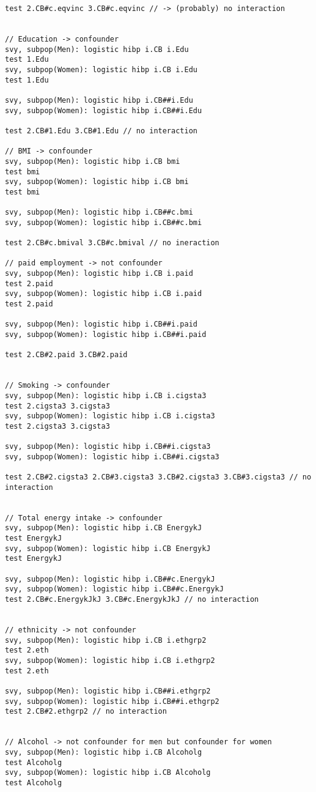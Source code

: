 \documentclass[]{article}
\begin{document}
\begin{verbatim}
test 2.CB#c.eqvinc 3.CB#c.eqvinc // -> (probably) no interaction


// Education -> confounder
svy, subpop(Men): logistic hibp i.CB i.Edu 
test 1.Edu
svy, subpop(Women): logistic hibp i.CB i.Edu 
test 1.Edu

svy, subpop(Men): logistic hibp i.CB##i.Edu 
svy, subpop(Women): logistic hibp i.CB##i.Edu 

test 2.CB#1.Edu 3.CB#1.Edu // no interaction

// BMI -> confounder
svy, subpop(Men): logistic hibp i.CB bmi
test bmi
svy, subpop(Women): logistic hibp i.CB bmi
test bmi

svy, subpop(Men): logistic hibp i.CB##c.bmi
svy, subpop(Women): logistic hibp i.CB##c.bmi

test 2.CB#c.bmival 3.CB#c.bmival // no ineraction

// paid employment -> not confounder
svy, subpop(Men): logistic hibp i.CB i.paid
test 2.paid
svy, subpop(Women): logistic hibp i.CB i.paid
test 2.paid

svy, subpop(Men): logistic hibp i.CB##i.paid
svy, subpop(Women): logistic hibp i.CB##i.paid

test 2.CB#2.paid 3.CB#2.paid


// Smoking -> confounder
svy, subpop(Men): logistic hibp i.CB i.cigsta3
test 2.cigsta3 3.cigsta3
svy, subpop(Women): logistic hibp i.CB i.cigsta3
test 2.cigsta3 3.cigsta3

svy, subpop(Men): logistic hibp i.CB##i.cigsta3
svy, subpop(Women): logistic hibp i.CB##i.cigsta3

test 2.CB#2.cigsta3 2.CB#3.cigsta3 3.CB#2.cigsta3 3.CB#3.cigsta3 // no interaction
 

// Total energy intake -> confounder
svy, subpop(Men): logistic hibp i.CB EnergykJ
test EnergykJ
svy, subpop(Women): logistic hibp i.CB EnergykJ
test EnergykJ

svy, subpop(Men): logistic hibp i.CB##c.EnergykJ
svy, subpop(Women): logistic hibp i.CB##c.EnergykJ
test 2.CB#c.EnergykJkJ 3.CB#c.EnergykJkJ // no interaction


// ethnicity -> not confounder
svy, subpop(Men): logistic hibp i.CB i.ethgrp2
test 2.eth
svy, subpop(Women): logistic hibp i.CB i.ethgrp2
test 2.eth

svy, subpop(Men): logistic hibp i.CB##i.ethgrp2
svy, subpop(Women): logistic hibp i.CB##i.ethgrp2
test 2.CB#2.ethgrp2 // no interaction


// Alcohol -> not confounder for men but confounder for women
svy, subpop(Men): logistic hibp i.CB Alcoholg
test Alcoholg
svy, subpop(Women): logistic hibp i.CB Alcoholg
test Alcoholg


\end{verbatim}
\end{document}
